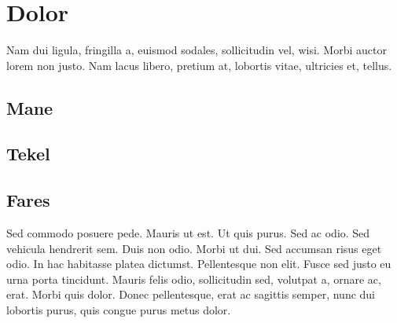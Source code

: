
\chapter{Dolor}
\label{cap:dolor}

Nam dui ligula, fringilla a, euismod sodales, sollicitudin vel, wisi. Morbi auctor lorem non justo. Nam lacus libero, pretium at, lobortis vitae, ultricies et, tellus. 

\section{Mane}
\lipsum[5]

\section{Tekel}
\lipsum[6]

\section{Fares}
Sed commodo posuere pede. Mauris ut est. Ut quis purus. Sed ac odio. Sed vehicula hendrerit sem. Duis non odio. Morbi ut dui. Sed accumsan risus eget odio. In hac habitasse platea dictumst. Pellentesque non elit. Fusce sed justo eu urna porta tincidunt. Mauris felis odio, sollicitudin sed, volutpat a, ornare ac, erat. Morbi quis dolor. Donec pellentesque, erat ac sagittis semper, nunc dui lobortis purus, quis congue purus metus dolor.
